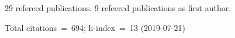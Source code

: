 29 refereed publications. 9 refeered publications as first author.

Total citations~=~694; h-index~=~13 (2019-07-21)